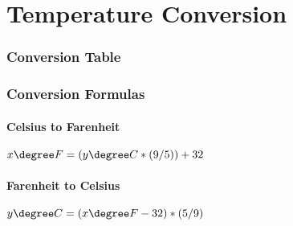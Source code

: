 \chapter{Temperature Conversion}
\label{sec:temperatureconversion}
\subsection*{Conversion Table}
\subsection*{Conversion Formulas}
\subsubsection*{Celsius to Farenheit}
$x\degree F=(y\degree C*(9/5))+32$
\subsubsection*{Farenheit to Celsius}
$y\degree C=(x\degree F-32)*(5/9)$
